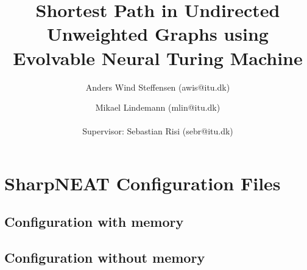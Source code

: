 \documentclass{article}
\author{Anders Wind Steffensen (awis@itu.dk)\and Mikael Lindemann (mlin@itu.dk)\\\\Supervisor: Sebastian Risi (sebr@itu.dk)}
\title{Shortest Path in Undirected Unweighted Graphs using Evolvable Neural Turing Machine}
\begin{document}

\maketitle
\tableofcontents
\listoftodos
\newpage







\clearpage


\newpage

\appendix
\section{SharpNEAT Configuration Files}
\label{appendix:sharpneat:configurations}
\subsection{Configuration with memory}


\subsection{Configuration without memory}

\end{document}
